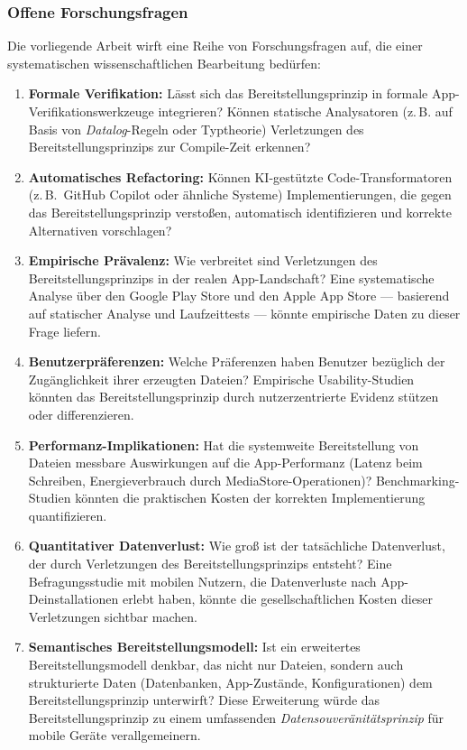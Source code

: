﻿\documentclass[12pt, a4paper]{article}
\begin{document}
\subsubsection{Offene Forschungsfragen}

Die vorliegende Arbeit wirft eine Reihe von Forschungsfragen auf, die einer
systematischen wissenschaftlichen Bearbeitung bedürfen:

\begin{enumerate}[label=\textbf{F\arabic*.}, leftmargin=*]
  \item \textbf{Formale Verifikation:} Lässt sich das Bereitstellungsprinzip in formale
    App-Verifi\-kationswerkzeuge integrieren? Können statische Analysatoren (z.\,B. auf
    Basis von \emph{Datalog}-Regeln oder Typtheorie) Verletzungen des
    Bereitstellungsprinzips zur Compile-Zeit erkennen?
  \item \textbf{Automatisches Refactoring:} Können KI-gestützte Code-Transformatoren
    (z.\,B.\ GitHub Copilot oder ähnliche Systeme) Implementierungen, die gegen das
    Bereitstellungsprinzip verstoßen, automatisch identifizieren und korrekte Alternativen
    vorschlagen?
  \item \textbf{Empirische Prävalenz:} Wie verbreitet sind Verletzungen des
    Bereitstellungsprinzips in der realen App-Landschaft? Eine systematische Analyse
    über den Google Play Store und den Apple App Store --- basierend auf statischer
    Analyse und Laufzeittests --- könnte empirische Daten zu dieser Frage liefern.
  \item \textbf{Benutzerpräferenzen:} Welche Präferenzen haben Benutzer bezüglich der
    Zugänglichkeit ihrer erzeugten Dateien? Empirische Usability-Studien könnten das
    Bereitstellungsprinzip durch nutzerzentrierte Evidenz stützen oder differenzieren.
  \item \textbf{Performanz-Implikationen:} Hat die systemweite Bereitstellung von Dateien
    messbare Auswirkungen auf die App-Performanz (Latenz beim Schreiben,
    Energie\-verbrauch durch MediaStore-Operationen)? Benchmarking-Studien könnten die
    praktischen Kosten der korrekten Implementierung quantifizieren.
  \item \textbf{Quantitativer Datenverlust:} Wie groß ist der tatsächliche Datenverlust,
    der durch Verletzungen des Bereitstellungsprinzips entsteht? Eine Befragungsstudie
    mit mobilen Nutzern, die Datenverluste nach App-Deinstallationen erlebt haben, könnte
    die gesellschaftlichen Kosten dieser Verletzungen sichtbar machen.
  \item \textbf{Semantisches Bereitstellungsmodell:} Ist ein erweitertes
    Bereitstellungsmodell denkbar, das nicht nur Dateien, sondern auch strukturierte Daten
    (Datenbanken, App-Zustände, Konfigurationen) dem Bereitstellungsprinzip unterwirft?
    Diese Erweiterung würde das Bereitstellungsprinzip zu einem umfassenden
    \emph{Datensouveränitätsprinzip} für mobile Geräte verallgemeinern.
\end{enumerate}
\end{document}
